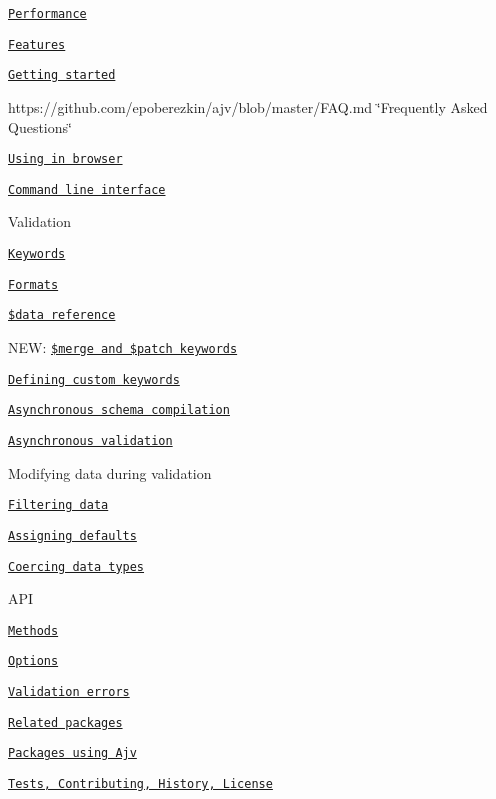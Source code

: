 \begin{DoxyItemize}
\item \href{#performance}{\tt Performance}
\item \href{#features}{\tt Features}
\item \href{#getting-started}{\tt Getting started}
\item https\+://github.com/epoberezkin/ajv/blob/master/\+F\+A\+Q.\+md \char`\"{}\+Frequently Asked Questions\char`\"{}
\item \href{#using-in-browser}{\tt Using in browser}
\item \href{#command-line-interface}{\tt Command line interface}
\item Validation
\begin{DoxyItemize}
\item \href{#validation-keywords}{\tt Keywords}
\item \href{#formats}{\tt Formats}
\item \href{#data-reference}{\tt \$data reference}
\item N\+EW\+: \href{#merge-and-patch-keywords}{\tt \$merge and \$patch keywords}
\item \href{#defining-custom-keywords}{\tt Defining custom keywords}
\item \href{#asynchronous-schema-compilation}{\tt Asynchronous schema compilation}
\item \href{#asynchronous-validation}{\tt Asynchronous validation}
\end{DoxyItemize}
\item Modifying data during validation
\begin{DoxyItemize}
\item \href{#filtering-data}{\tt Filtering data}
\item \href{#assigning-defaults}{\tt Assigning defaults}
\item \href{#coercing-data-types}{\tt Coercing data types}
\end{DoxyItemize}
\item A\+PI
\begin{DoxyItemize}
\item \href{#api}{\tt Methods}
\item \href{#options}{\tt Options}
\item \href{#validation-errors}{\tt Validation errors}
\end{DoxyItemize}
\item \href{#related-packages}{\tt Related packages}
\item \href{#some-packages-using-ajv}{\tt Packages using Ajv}
\item \href{#tests}{\tt Tests, Contributing, History, License}
\end{DoxyItemize}

